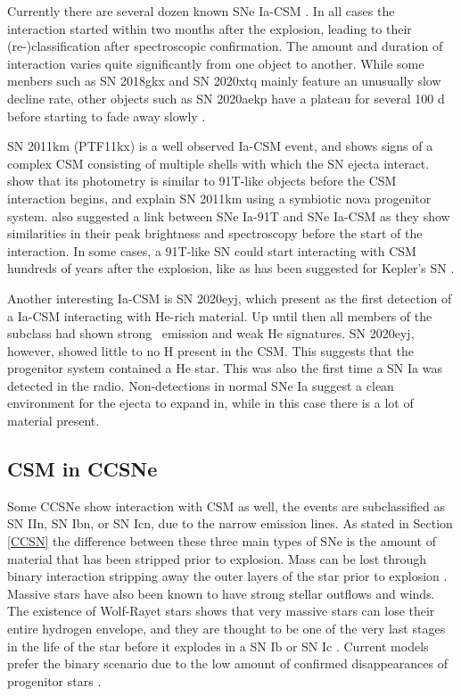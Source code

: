 \documentclass[a4paper,oneside,12pt, class=Latex/Classes/PhDthesisPSnPDF, crop=false]{standalone}
\begin{document}
Currently there are several dozen known SNe Ia-CSM \citep{2005gj, Ia-CSM_Silverman, Ia-CSM_BTS}. In all cases the interaction started within two months after the explosion, leading to their (re-)classification after spectroscopic confirmation. The amount and duration of interaction varies quite significantly from one object to another. While some menbers such as SN 2018gkx and SN 2020xtq mainly feature an unusually slow decline rate, other objects such as SN 2020aekp have a plateau for several 100 d before starting to fade away slowly \citep{Ia-CSM_BTS}.

SN 2011km (PTF11kx) is a well observed Ia-CSM event, and shows signs of a complex CSM consisting of multiple shells with which the SN ejecta interact. \citet{ptf11kx} show that its photometry is similar to 91T-like objects before the CSM interaction begins, and explain SN 2011km using a symbiotic nova progenitor system. \citet{Ia-CSM_and_91T_connection} also suggested a link between SNe Ia-91T and SNe Ia-CSM as they show  similarities in their peak brightness and spectroscopy before the start of the interaction. In some cases, a 91T-like SN could start interacting with CSM hundreds of years after the explosion, like as has been suggested for Kepler’s SN \citet{Kepler_91T, Kepler_CSM}.

Another interesting Ia-CSM is SN 2020eyj, which \citet{Kool_He_CSM} present as the first detection of a Ia-CSM interacting with He-rich material. Up until then all members of the subclass had shown strong \Halpha\ emission and weak He signatures. SN 2020eyj, however, showed little to no H present in the CSM. This suggests that the progenitor system contained a He star. This was also the first time a SN Ia was detected in the radio. Non-detections in normal SNe Ia suggest a clean environment for the ejecta to expand in, while in this case there is a lot of material present.


\subsection{CSM in CCSNe}
Some CCSNe show interaction with CSM as well, the events are subclassified as SN IIn, SN Ibn, or SN Icn, due to the narrow emission lines. As stated in Section \ref{CCSN} the difference between these three main types of SNe is the amount of material that has been stripped prior to explosion. Mass can be lost through binary interaction stripping away the outer layers of the star prior to explosion \citep{Ic_binary_progenitors}. Massive stars have also been known to have strong stellar outflows and winds. The existence of Wolf-Rayet stars shows that very massive stars can lose their entire hydrogen envelope, and they are thought to be one of the very last stages in the life of the star before it explodes in a SN Ib or SN Ic \citep{WR_as_progenitors, 2019hgp}. Current models prefer the binary scenario due to the low amount of confirmed disappearances of progenitor stars \citep{CCSN_disappeared_progenitor}.
\end{document}
